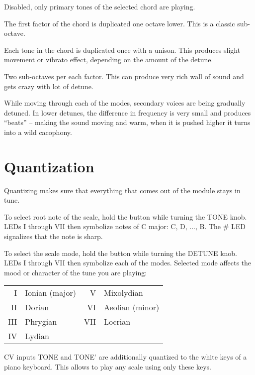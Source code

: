 \documentclass[10pt,nofoldmark,nocombine]{leaflet} %
\newenvironment{packed_enumerate_i}{
\begin{enumerate}[I]
  \setlength{\itemsep}{1pt}
  \setlength{\parskip}{0pt}
  \setlength{\parsep}{0pt}
}{\end{enumerate}}
\begin{document}
\begin{packed_enumerate_i}
  \item Disabled, only primary tones of the selected chord are playing.
  \item The first factor of the chord is duplicated one octave lower. This is a classic sub-octave.
  \item Each tone in the chord is duplicated once with a unison. This produces slight movement or vibrato effect, depending on the amount of the detune.
  \item Two sub-octaves per each factor. This can produce very rich wall of sound and gets crazy with lot of detune.
\end{packed_enumerate_i}

While moving through each of the modes, secondary voices are being gradually detuned. In lower detunes, the difference in frequency is very small and produces ``beats'' -- making the sound moving and warm, when it is pushed higher it turns into a wild cacophony.

\section{Quantization}

Quantizing makes sure that everything that comes out of the module stays in tune.

To select root note of the scale, hold the button while turning the TONE knob. LEDs I through VII then symbolize notes of C major: C, D, ..., B. The \# LED signalizes that the note is sharp.

To select the scale mode, hold the button while turning the DETUNE knob. LEDs I through VII then symbolize each of the modes. Selected mode affects the mood or character of the tune you are playing:

\begin{tabular}{@{}rl@{}@{}rl@{}}
  I & Ionian (major) \hspace{15mm} & V & Mixolydian  \\
  II & Dorian & VI & Aeolian (minor) \\
  III & Phrygian & VII & Locrian \\
  IV & Lydian \\
\end{tabular}

CV inputs TONE and TONE' are additionally quantized to the white keys of a piano keyboard. This allows to play any scale using only these keys.
\end{document}
